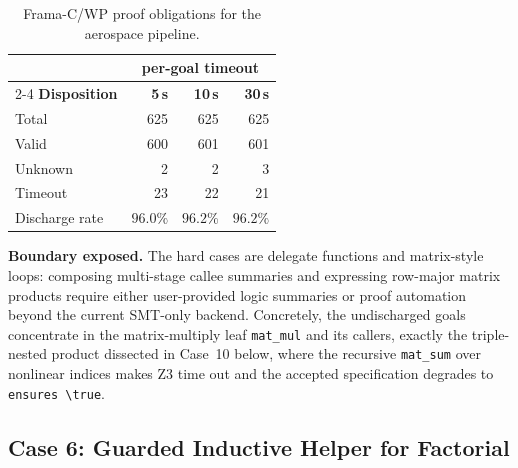 \begin{table}[!t]
  \centering
  \caption{Frama-C/WP proof obligations for the aerospace pipeline.}
  \label{tab:case9-wp}
  \begin{tabular}{lrrr}
    \toprule
    & \multicolumn{3}{c}{\textbf{per-goal timeout}} \\
    \cmidrule(lr){2-4}
    \textbf{Disposition} & \textbf{5\,s} & \textbf{10\,s} & \textbf{30\,s} \\
    \midrule
    Total       & 625           & 625           & 625           \\
    Valid       & 600           & 601           & 601           \\
    Unknown     & 2             & 2             & 3             \\
    Timeout     & 23            & 22            & 21            \\
    \midrule
    Discharge rate & $96.0\%$ & $96.2\%$ & $96.2\%$ \\
    \bottomrule
  \end{tabular}
\end{table}

\smallskip
\noindent\textbf{Boundary exposed.}
 The hard cases are delegate functions and matrix-style loops: composing multi-stage callee summaries and expressing row-major matrix products require either user-provided logic summaries or proof automation beyond the current SMT-only backend.  Concretely, the undischarged goals concentrate in the matrix-multiply leaf \texttt{mat\_mul} and its callers, exactly the triple-nested product dissected in Case~10 below, where the recursive \texttt{mat\_sum} over nonlinear indices makes Z3 time out and the accepted specification degrades to \texttt{ensures \textbackslash true}.

\subsection{Case 6: Guarded Inductive Helper for Factorial}
\label{app:case-factorial}

